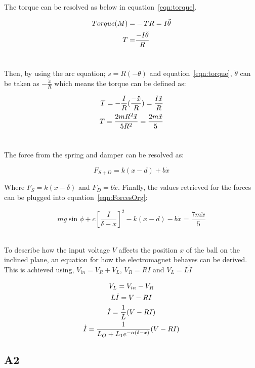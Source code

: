 \documentclass[a4paper,10pt,reqno]{amsart}
\numberwithin{equation}{section}
\begin{document}
The torque can be resolved as below in equation~\ref{eqn:torque}.

\begin{align}
    Torque(M)=&-TR=I\ddot{\theta}
    \notag\\
    T =& \frac{-I\ddot{\theta}}{R}
    \label{eqn:torque}
\end{align}
\\
\par Then, by using the arc equation; $s=R(-\theta)$ and equation~\ref{eqn:torque}, $\ddot{\theta}$ can be taken as $-\frac{\ddot{x}}{R}$ which means the torque can be defined as:

\begin{align}
    T=-\frac{I}{R}(\frac{-\ddot{x}}{R}) = \frac{I\ddot{x}}{R}
    \notag\\
    T = \frac{2mR^2\ddot{x}}{5R^2} = \frac{2m\ddot{x}}{5}
\end{align}
\\
\par The force from the spring and damper can be resolved as:

\begin{equation}
    F_{S+D}=k(x-d)+b\dot{x}
\end{equation}

\par Where $F_{S}=k(x-\delta)$ and $F_D=b\dot{x}$. Finally, the values retrieved for the forces can be plugged into equation~\ref{eqn:ForcesOrg}:

\begin{equation}
    mg\sin{\phi}+c[\frac{I}{\delta-x}]^2-k(x-d)-b\dot{x}=\frac{7m\ddot{x}}{5}
\end{equation}
\\
\par To describe how the input voltage $V$ affects the position $x$ of the ball on the inclined plane, an equation for how the electromagnet behaves can be derived. This is achieved using, $V_{in}=V_R+V_L$, $V_R=RI$ and $V_L=L\dot{I}$

\begin{gather}
    V_L=V_{in}-V_R
    \notag\\
    L\dot{I}=V-RI
    \notag\\
    \dot{I}=\frac{1}{L}(V-RI)
    \notag\\
    \dot{I}=\frac{1}{L_O+L_1e^{-\alpha(\delta-x)}}(V-RI)
\end{gather}

\subsection{A2}\label{sec:A2}
\end{document}
